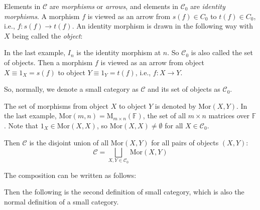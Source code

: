 \documentclass[
	11pt, %
	fleqn, %
	a4paper, %
]{LegrandOrangeBook}
\newcommand{\F}{\mathbb{F}} %
\newcommand{\M}[2]{\text{M}_{#1}(#2)} %
\newcommand{\C}{\mathcal{C}} %
\newcommand{\Mor}{\text{Mor}} %
\begin{document}
\begin{remark}
    Elements in $\C$ are \emph{morphisms} or \emph{arrows}, and elements in $\C_0$ are \emph{identity morphisms}. A morphism $f$ is viewed as an arrow from $s(f) \in C_0$ to $t(f) \in C_0$, i.e., $f : s(f) \to t(f)$. 
    An identity morphism is drawn in the following way with $X$ being called the \emph{object}:
    \begin{center}
    \end{center}
    In the last example, $I_n$ is the identity morphism at $n$. So $\C_0$ is also called the set of objects. Then a morphism $f$ is viewed as an arrow from object $X \equiv 1_X = s(f)$ to object $Y \equiv 1_Y = t(f)$, i.e., $f : X \to Y$.
\end{remark}

So, normally, we denote a small category as $\C$ and its set of objects as $\C_0$.

\begin{remark}
    The set of morphisms from object $X$ to object $Y$ is denoted by $\Mor(X, Y)$. In the last example, $\Mor(m, n) = \M{m \times n}{\F}$, the set of all $m \times n$ matrices over $\F$. Note that $1_X \in \Mor(X, X)$, so $\Mor(X, X) \neq \emptyset$ for all $X \in \C_0$.
\end{remark}

Then $\C$ is the disjoint union of all $\Mor(X, Y)$ for all pairs of objects $(X, Y)$:
\[
    \C = \bigsqcup_{X, Y \in \C_0} \Mor(X, Y)
\]

\begin{remark}
    The composition can be written as follows:
    \begin{center}
    \end{center}
\end{remark}

Then the following is the second definition of small category, which is also the normal definition of a small category.
\end{document}
